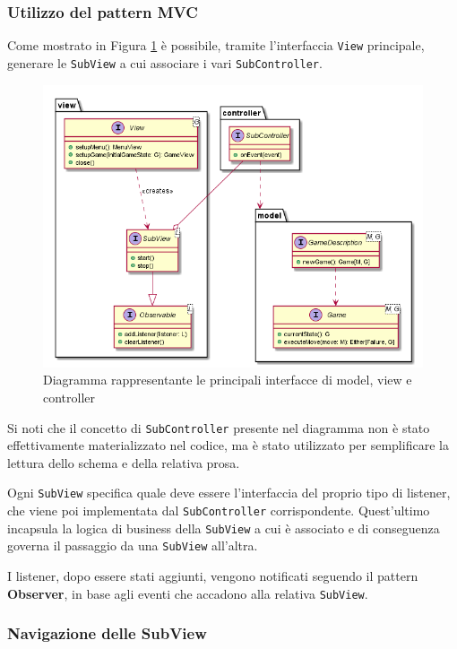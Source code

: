 \subsubsection{Utilizzo del pattern MVC}

Come mostrato in Figura \ref{fig:main_class_diagram} è possibile, tramite l'interfaccia \texttt{View} principale, generare le \texttt{SubView} a cui associare i vari \texttt{SubController}.
%
\begin{figure}
  \centering
  \includegraphics[width=\linewidth]{images/uml/main_class_diagram.png}
  \caption{Diagramma rappresentante le principali interfacce di model, view e controller}
  \label{fig:main_class_diagram}
\end{figure}
%
Si noti che il concetto di \texttt{SubController} presente nel diagramma non è stato effettivamente materializzato nel codice, ma è stato utilizzato per semplificare la lettura dello schema e della relativa prosa.

Ogni \texttt{SubView} specifica quale deve essere l'interfaccia del proprio tipo di listener, che viene poi implementata dal \texttt{SubController} corrispondente.
%
Quest'ultimo incapsula la logica di business della \texttt{SubView} a cui è associato e di conseguenza governa il passaggio da una \texttt{SubView} all'altra.

I listener, dopo essere stati aggiunti, vengono notificati seguendo il pattern \textbf{Observer}, in base agli eventi che accadono alla relativa \texttt{SubView}.

\subsubsection{Navigazione delle SubView}

